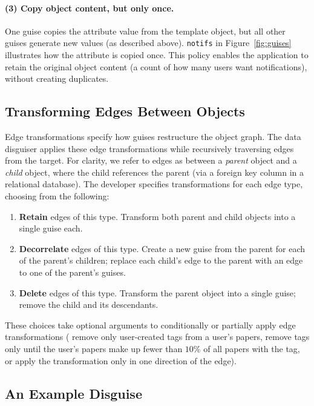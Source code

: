 \paragraph{(3) Copy object content, but only once.} One guise copies the attribute value from the
template object, but all other guises generate new values (as described above).  \texttt{notifs} in
Figure~\ref{fig:guises} illustrates how the attribute is copied once. This policy enables the
application to retain the original object content (\eg a count of how many users want
notifications), without \eg creating duplicates.

\subsection{Transforming Edges Between Objects}
\label{design:edgepol}

Edge transformations specify how guises restructure the object graph.  The data disguiser applies
these edge transformations while recursively traversing edges from the target.  For clarity, we
refer to edges as between a \emph{parent} object and a \emph{child} object, where the child
references the parent (\eg via a foreign key column in a relational database).
%
The developer specifies transformations for each edge type, choosing from the following:
\begin{enumerate}[nosep]
    \item \textbf{Retain} edges of this type. Transform both parent and child objects into a single guise
        each.
    \item \textbf{Decorrelate} edges of this type. Create a new guise from the parent for each of
        the parent's children; replace each child's edge to the parent with an edge to one of the
        parent's guises.
    \item \textbf{Delete} edges of this type. Transform the parent object into a single guise;
        remove the child and its descendants.
\end{enumerate}
These choices take optional arguments to conditionally or partially apply edge transformations (\eg
remove only user-created tags from a user's papers, remove tags only until the user's papers make
up fewer than $10$\% of all papers with the tag, or apply the transformation only in one direction
of the edge).

\subsection{An Example Disguise}
\label{design:eg}

